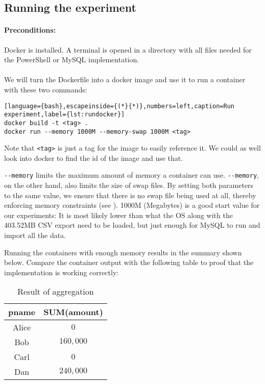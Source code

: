 \subsection{Running the experiment}

\paragraph{Preconditions:}
Docker is installed. A terminal is opened in a directory
with all files needed for the \gls{PowerShell} or \gls{MySQL} implementation. \\\\
We will turn the Dockerfile into a docker image and use it to
run a container with these two commands:

\begin{lstlisting}[language={bash},escapeinside={(*}{*)},numbers=left,caption=Run experiment,label={lst:rundocker}]
docker build -t <tag> .
docker run --memory 1000M --memory-swap 1000M <tag>
\end{lstlisting}
Note that \verb+<tag>+ is just a tag for the image to easily reference it.
We could as well look into docker to find the id of the image and use that.

\verb+--memory+ limits the maximum amount of memory
a container can use. \verb+--memory+, on the other hand, also limits
the size of \gls{swap} files. By setting both parameters to the same value,
we ensure that there is no \gls{swap} file being used at all, thereby
enforcing memory constraints (see \cite{dockerMem}). 1000M (Megabytes) is a good start value
for our experiments: It is most likely lower than what the \gls{OS} along with the 403.52MB
\gls{CSV} export need to be loaded, but just enough for \gls{MySQL} to run and import
all the data.

Running the containers with enough memory results in the summary shown
below. Compare the container output with the following table to proof
that the implementation is working correctly:

\begin{table}[htbp]
    \centering
    \begin{tabular}{|c|c|}
        \hline
        pname & SUM(amount) \\ \hline\hline
        Alice & $0$ \\ \hline
        Bob   & $160,000$ \\ \hline
        Carl  & $0$ \\ \hline
        Dan   & $240,000$ \\ \hline
    \end{tabular}
    \caption{Result of aggregation}
    \label{Result of aggregation}
\end{table}

